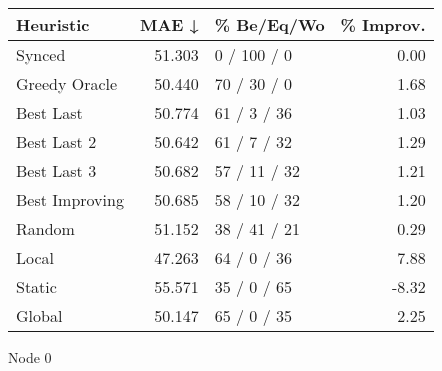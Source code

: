 \begin{tabular}{lrlr}
\toprule
\textbf{Heuristic} & \textbf{MAE ↓} & \textbf{\% Be/Eq/Wo} & \textbf{\% Improv.} \\
\midrule
            Synced &         51.303 &          0 / 100 / 0 &                0.00 \\
     Greedy Oracle &         50.440 &          70 / 30 / 0 &                1.68 \\
         Best Last &         50.774 &          61 / 3 / 36 &                1.03 \\
       Best Last 2 &         50.642 &          61 / 7 / 32 &                1.29 \\
       Best Last 3 &         50.682 &         57 / 11 / 32 &                1.21 \\
    Best Improving &         50.685 &         58 / 10 / 32 &                1.20 \\
            Random &         51.152 &         38 / 41 / 21 &                0.29 \\
             Local &         47.263 &          64 / 0 / 36 &                7.88 \\
            Static &         55.571 &          35 / 0 / 65 &               -8.32 \\
            Global &         50.147 &          65 / 0 / 35 &                2.25 \\
\bottomrule
\end{tabular}
\caption{Node 0}
\label{tab:non_lr01_le2_bs2_0}
